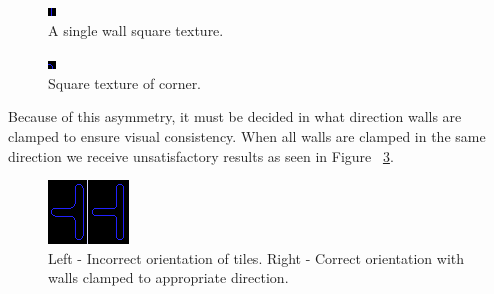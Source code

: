 \documentclass{article}
\begin{document}
\begin{figure}[H]
\centering
\includegraphics[width=0.5\linewidth]{Image-2.png}\hfill
\caption {A single wall square texture.}
\label{Straight wall texture}
\end{figure}

\begin{figure}[H]
\centering
\includegraphics[width=0.5\linewidth]{Image-3.png}\hfill
\caption {Square texture of corner.}\label{fig:CornerTexture}
\end{figure}

Because of this asymmetry, it must be decided in what direction walls are clamped to ensure visual consistency. When all walls are clamped in the same direction we receive unsatisfactory results as seen in Figure ~\ref{Wall Texture Asymmetry}.

\begin{figure}[H]
\centering
\includegraphics[width=0.5\linewidth]{Image-4.png}
\caption {Left - Incorrect orientation of tiles. Right - Correct orientation with walls clamped to appropriate direction.}\label{Wall Texture Asymmetry}
\end{figure}
\end{document}
